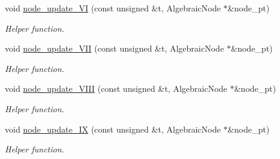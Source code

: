 \begin{DoxyCompactItemize}
void \hyperlink{classoomph_1_1AlgebraicCylinderWithFlagMesh_a989fe557f03ac20812e69a8de2dbb9a4}{node\+\_\+update\+\_\+\+VI} (const unsigned \&t, Algebraic\+Node $\ast$\&node\+\_\+pt)
\begin{DoxyCompactList}\small\item\em Helper function. \end{DoxyCompactList}\item 
void \hyperlink{classoomph_1_1AlgebraicCylinderWithFlagMesh_abb0565f0624583d2549f38602fd11e48}{node\+\_\+update\+\_\+\+V\+II} (const unsigned \&t, Algebraic\+Node $\ast$\&node\+\_\+pt)
\begin{DoxyCompactList}\small\item\em Helper function. \end{DoxyCompactList}\item 
void \hyperlink{classoomph_1_1AlgebraicCylinderWithFlagMesh_a85336e587d9c4cac7f4d77890dd7690b}{node\+\_\+update\+\_\+\+V\+I\+II} (const unsigned \&t, Algebraic\+Node $\ast$\&node\+\_\+pt)
\begin{DoxyCompactList}\small\item\em Helper function. \end{DoxyCompactList}\item 
void \hyperlink{classoomph_1_1AlgebraicCylinderWithFlagMesh_ae8e85400abd282b64463b67e21e9c13a}{node\+\_\+update\+\_\+\+IX} (const unsigned \&t, Algebraic\+Node $\ast$\&node\+\_\+pt)
\begin{DoxyCompactList}\small\item\em Helper function. \end{DoxyCompactList}\end{DoxyCompactItemize}
